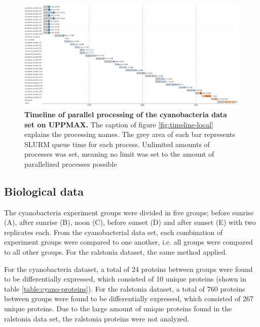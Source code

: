 \begin{figure}[H]
  \includegraphics[width=\linewidth]{results/timeline-cluster.png}
  \caption{\textbf{Timeline of parallel processing of the cyanobacteria data set on UPPMAX.} The caption of figure \ref{fig:timeline-local} explains the processing names. The grey area of each bar represents SLURM queue time for each process. Unlimited amounts of processes was set, meaning no limit was set to the amount of parallelized processes possible}
  \label{fig:timeline-cluster}
\end{figure}

\subsection{Biological data}

The cyanobacteria experiment groups were divided in five groups; before sunrise (A), after sunrise (B), noon (C), before sunset (D) and after sunset (E) with two replicates each. From the cyanobacterial data set, each combination of experiment groups were compared to one another, i.e. all groups were compared to all other groups. For the ralstonia dataset, the same method applied.

For the cyanobacteria dataset, a total of 24 proteins between groups were found to be differentially expressed, which consisted of 10 unique proteins (shown in table \ref{table:cyano-proteins}). For the ralstonia dataset, a total of 760 proteins between groups were found to be differentially expressed, which consisted of 267 unique proteins. Due to the large amount of unique proteins found in the ralstonia data set, the ralstonia proteins were not analyzed.

